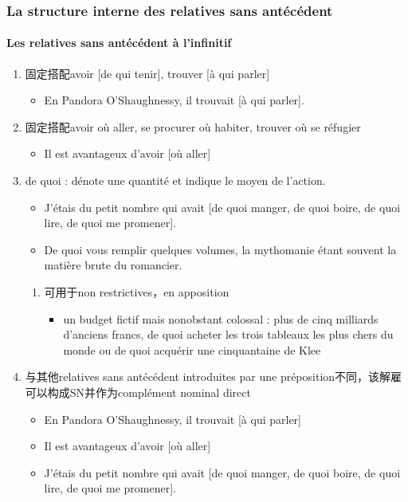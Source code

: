 \documentclass[UTF8]{report}
\begin{document}
\subsubsection{La structure interne des relatives sans antécédent}
\paragraph{Les relatives sans antécédent à l’infinitif}
\begin{enumerate}
    \item 固定搭配avoir [de qui tenir], trouver [à qui parler]
    \begin{itemize}
        \item En Pandora O’Shaughnessy, il trouvait [à qui parler].
    \end{itemize}
    \item 固定搭配avoir où aller, se procurer où habiter, trouver où se réfugier
    \begin{itemize}
        \item Il est avantageux d’avoir [où aller] 
    \end{itemize}
    \item de quoi : dénote une quantité et indique le moyen de l’action. 
    \begin{itemize}
            \item J’étais du petit nombre qui avait [de quoi manger, de quoi boire, de quoi lire, de quoi me promener].
            \item De quoi vous remplir quelques volumes, la mythomanie étant souvent la matière brute du romancier. 
        \end{itemize}
    \begin{enumerate}
        \item 可用于non restrictives，en apposition
        \begin{itemize}
            \item un budget fictif mais nonobstant colossal : plus de cinq milliards d’anciens francs, de quoi acheter les trois tableaux les plus chers du monde ou de quoi acquérir une cinquantaine de Klee
        \end{itemize}
    \end{enumerate}
    \item 与其他relatives sans antécédent introduites par une préposition不同，该解雇可以构成SN并作为complément nominal direct
        \begin{itemize}
            \item En Pandora O’Shaughnessy, il trouvait [à qui parler]
            \item Il est avantageux d’avoir [où aller]
            \item J’étais du petit nombre qui avait [de quoi manger, de quoi boire, de quoi lire, de quoi me promener].
        \end{itemize}
\end{enumerate}
\end{document}

